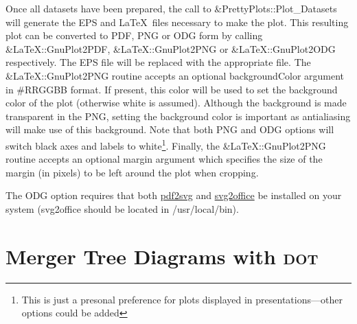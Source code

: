 Once all datasets have been prepared, the call to {\normalfont \ttfamily \&PrettyPlots::Plot\_Datasets} will generate the EPS and \LaTeX\ files necessary to make the plot. This resulting plot can be converted to PDF, PNG or ODG form by calling {\normalfont \ttfamily \&LaTeX::GnuPlot2PDF}, {\normalfont \ttfamily \&LaTeX::GnuPlot2PNG} or {\normalfont \ttfamily \&LaTeX::GnuPlot2ODG} respectively. The EPS file will be replaced with the appropriate file. The {\normalfont \ttfamily \&LaTeX::GnuPlot2PNG} routine accepts an optional {\normalfont \ttfamily backgroundColor} argument in {\normalfont \ttfamily \#RRGGBB} format. If present, this color will be used to set the background color of the plot (otherwise white is assumed). Although the background is made transparent in the PNG, setting the background color is important as antialiasing will make use of this background. Note that both PNG and ODG options will switch black axes and labels to white\footnote{This is just a presonal preference for plots displayed in presentations---other options could be added}. Finally, the {\normalfont \ttfamily \&LaTeX::GnuPlot2PNG} routine accepts an optional {\normalfont \ttfamily margin} argument which specifies the size of the margin (in pixels) to be left around the plot when cropping.

The ODG option requires that both \href{http://www.cityinthesky.co.uk/opensource/pdf2svg}{{\normalfont \ttfamily pdf2svg}} and \href{http://www.haumacher.de/svg-import/}{{svg2office}} be installed on your system ({\normalfont \ttfamily svg2office} should be located in {\normalfont \ttfamily /usr/local/bin}).

\section{Merger Tree Diagrams with {\normalfont \scshape dot}}

